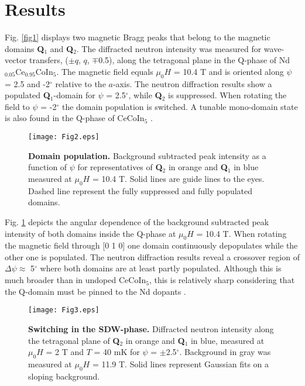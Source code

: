 \documentclass[article,twocolumn,showpacs,preprintnumbers,amsmath,amssymb, superscriptaddress]{revtex4-1}
\begin{document}
\section*{Results}

Fig. \ref{fig1} displays two magnetic Bragg peaks that belong to the magnetic domains \textbf{Q$_1$} and \textbf{Q$_2$}. The diffracted neutron intensity was measured for wave-vector transfers, ($\pm q$, $q$, $\mp$0.5), along the tetragonal plane in the Q-phase of Nd$_{0.05}$Ce$_{0.95}$CoIn$_5$. The magnetic field equals $\mu_0H$ = 10.4 T and is oriented along $\psi$ = 2.5 and -2$^\circ$ relative to the $a$-axis. The neutron diffraction results show a populated \textbf{Q$_1$}-domain for $\psi$ = 2.5$^\circ$, while \textbf{Q$_2$} is suppressed. When rotating the field to $\psi$ = -2$^\circ$ the domain population is switched. A tunable mono-domain state is also found in the Q-phase of CeCoIn$_5$ \cite{Gerber2014}. 

\begin{figure}[tbh]
	\begin{center}
\texttt{[image: Fig2.eps]}
\caption{\textbf{Domain population.} Background subtracted peak intensity as a function of $\psi$ for representatives of \textbf{Q$_2$} in orange and \textbf{Q$_1$} in blue measured at $\mu_0H$ = 10.4 T. Solid lines are guide lines to the eyes. Dashed line represent the fully suppressed and fully populated domains.}
\label{fig2}
	\end{center}
\end{figure}


Fig. \ref{fig2} depicts the angular dependence of the background subtracted peak intensity of both domains inside the Q-phase at $\mu_0H$ = 10.4 T. When rotating the magnetic field through [0 1 0] one domain continuously depopulates while the other one is populated. The neutron diffraction results reveal a crossover region of $\Delta\psi\approx$ 5$^\circ$ where both domains are at least partly populated. Although this is much broader than in undoped CeCoIn$_5$, this is relatively sharp considering that the Q-domain must be pinned to the Nd dopants \cite{Gerber2014}. 

\begin{figure}[tbh]
\texttt{[image: Fig3.eps]}
\caption{\textbf{Switching in the SDW-phase.} Diffracted neutron intensity along the tetragonal plane of \textbf{Q$_2$} in orange and \textbf{Q$_1$} in blue, measured at $\mu_0H$ = 2 T and $T$ = 40 mK for $\psi$ = $\pm$2.5$^\circ$. Background in gray was measured at $\mu_0H$ = 11.9 T. Solid lines represent Gaussian fits on a sloping background.} 
\label{fig3}
\end{figure}
\end{document}
